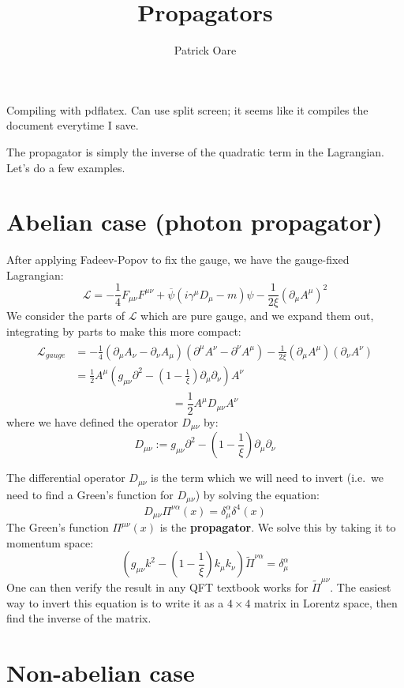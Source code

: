 \documentclass[11pt, oneside]{article}   	%
\title{Propagators}
\author{Patrick Oare}
\date{}							%
\theoremstyle{definition}
\begin{document}
\maketitle

Compiling with pdflatex. Can use split screen; it seems like it compiles the document everytime I save. 

The propagator is simply the inverse of the quadratic term in the Lagrangian. Let's do a few examples.

\section{Abelian case (photon propagator)}

After applying Fadeev-Popov to fix the gauge, we have the gauge-fixed Lagrangian:
\begin{equation}
	\mathcal L = -\frac{1}{4} F_{\mu\nu}F^{\mu\nu} + \overline\psi (i\gamma^\mu D_\mu - m)\psi -\frac{1}{2\xi} {(\partial_\mu 
	A^\mu)}^2
\end{equation}
We consider the parts of $\mathcal L$ which are pure gauge, and we expand them out, integrating by parts to make this more 
compact:
\begin{align}\begin{split}
	\mathcal L_{gauge} &= -\frac{1}{4} (\partial_\mu A_\nu - \partial_\nu A_\mu) (\partial^\mu A^\nu - \partial^\nu A^\mu) - 
	\frac{1}{2\xi}(\partial_\mu A^\mu)(\partial_\nu A^\nu) \\
	&= \frac{1}{2} A^\mu \left(g_{\mu\nu}\partial^2 - \left(1 - \frac{1}{\xi}\right) \partial_\mu\partial_\nu\right) A^\nu
\end{split}\end{align}
\begin{equation}
	= \frac{1}{2}A^\mu D_{\mu\nu} A^\nu
\end{equation}
where we have defined the operator $D_{\mu\nu}$ by:
\begin{equation}
	D_{\mu\nu} := g_{\mu\nu}\partial^2 - \left(1 - \frac{1}{\xi}\right)\partial_\mu\partial_\nu
\end{equation}

The differential operator $D_{\mu\nu}$ is the term which we will need to invert (i.e.\ we need to find a Green's function for 
$D_{\mu\nu}$) by solving the equation:
\begin{equation}
	D_{\mu\nu}\Pi^{\nu\alpha}(x) = \delta^\alpha_\mu \delta^4(x)
\end{equation}
The Green's function $\Pi^{\mu\nu}(x)$ is the \textbf{propagator}. We solve this by taking it to momentum space:
\begin{equation}
	\left(g_{\mu\nu}k^2 - \left(1 - \frac{1}{\xi}\right) k_\mu k_\nu\right)\tilde\Pi^{\nu\alpha} = \delta^\alpha_\mu
\end{equation}
One can then verify the result in any QFT textbook works for $\tilde\Pi^{\mu\nu}$. The easiest way to invert this equation is to 
write it as a $4\times 4$ matrix in Lorentz space, then find the inverse of the matrix. 

\section{Non-abelian case}
\end{document}
